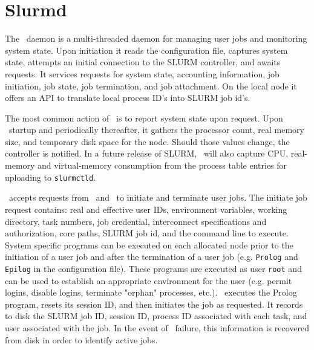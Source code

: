 \section{Slurmd}

The \slurmd\ daemon is a multi-threaded daemon for managing
user jobs and monitoring system state.  Upon initiation it reads
the configuration file, captures system state, attempts an initial
connection to the SLURM controller, and awaits requests.
It services requests for system state, accounting information,
job initiation, job state, job termination, and job attachment. On the
local node it offers an API to translate local process ID's into
SLURM job id's. 

The most common action of \slurmd\ is to report system state upon request. 
Upon \slurmd\ startup and periodically thereafter, it gathers the processor
count, real memory size, and temporary disk space for the node. Should
those values change, the controller is notified.  
In a future release of SLURM, \slurmd\ will also capture CPU, real-memory
and virtual-memory consumption from the process table entries for 
uploading to {\tt slurmctld}.

\slurmd\ accepts requests from \srun\ and \slurmctld\ to initiate
and terminate user jobs. The initiate job request contains: 
real and effective user IDs, environment variables, working directory, task
numbers, job credential, interconnect specifications and authorization,
core paths, SLURM job id, and the command line to execute. 
System specific programs can be executed on each allocated 
node prior to the initiation of a user job and after the termination of a 
user job (e.g. {\tt Prolog} and {\tt Epilog} in the configuration file).
These programs are executed as user {\tt root} and can be used to establish
an appropriate environment for the user (e.g. permit logins, disable
logins, terminate "orphan" processes, etc.).  
\slurmd\ executes the Prolog program, resets its
session ID, and then initiates the job as requested. It records to
disk the SLURM job ID, session ID, process ID associated with each task,
and user associated with the job.  In the event of \slurmd\ failure,
this information is recovered from disk in order to identify active
jobs.

